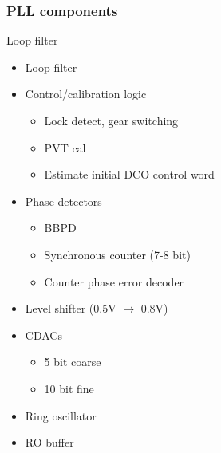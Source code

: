 \documentclass[t, screen, aspectratio=43]{beamer}
\begin{document}
\begin{frame}
	\frametitle{PLL components}
	\begin{block}{Loop filter}
		\begin{minipage}{6cm}
			\vspace{1em}
			\tiny

			\begin{itemize}[itemsep=4pt,label=\protect---]
				\item {\color{red}Loop filter}
				\item {\color{red}Control/calibration logic}
				\begin{itemize}[itemsep=4pt,label=$\bullet$]
					\item {\color{red}Lock detect, gear switching}
					\item {\color{red}PVT cal}
					\item {\color{red}Estimate initial DCO control word}
				\end{itemize}
				\item {\color{red}Phase detectors}
				\begin{itemize}[itemsep=4pt,label=$\bullet$]
					\item {\color{blue}BBPD}
					\item {\color{red}Synchronous counter (7-8 bit)}
					\item {\color{red}Counter phase error decoder}
				\end{itemize}
				\item {\color{red}Level shifter (0.5V $\rightarrow$ 0.8V)}
				\item {\color{blue}CDACs}
				\begin{itemize}[itemsep=4pt,label=$\bullet$]
					\item {\color{blue}5 bit coarse}
					\item {\color{blue}10 bit fine}
				\end{itemize}
				\item {\color{blue}Ring oscillator}
				\item {\color{blue}RO buffer}
			\end{itemize}


\end{minipage}
\end{block}
\end{frame}
\end{document}
